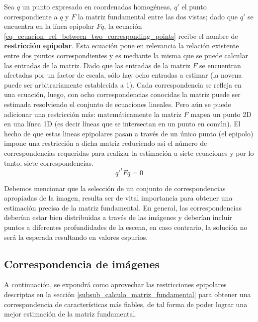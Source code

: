 \documentclass[a4paper,11pt,spanish]{article}
\begin{document}
Sea $q$ un punto expresado en coordenadas homogéneas, $q'$ el punto correspondiente a $q$ y $F$ la matriz fundamental entre las dos vistas; dado que $q'$ se encuentra en la línea epipolar $Fq$, la ecuación \eqref{eq_ecuacion_rel_between_two_corresponding_points} recibe el nombre de \textbf{restricción epipolar}. Esta ecuación pone en relevancia la relación existente entre dos puntos correspondientes y es mediante la misma que se puede calcular las entradas de la matriz. Dado que las entradas de la matriz $F$ se encuentran afectadas por un factor de escala, sólo hay ocho entradas a estimar (la novena puede ser arbitrariamente establecida a 1). Cada correspondencia se refleja en una ecuación, luego, con ocho correspondencias conocidas la matriz puede ser estimada resolviendo el conjunto de ecuaciones lineales. Pero aún se puede adicionar una restricción más: matemáticamente la matriz $F$ mapea un punto 2D en una línea 1D (es decir líneas que se intersectan en un punto en común). El hecho de que estas lineas epipolares pasan a través de un único punto (el epipolo) impone una restricción a dicha matriz reduciendo así el número de correspondencias requeridas para realizar la estimación a siete ecuaciones y por lo tanto, siete correspondencias.
\begin{equation}
  q'^tFq=0
  \label{eq_ecuacion_rel_between_two_corresponding_points}
\end{equation}

Debemos mencionar que la selección de un conjunto de correspondencias apropiadas de la imagen, resulta ser de vital importancia para obtener una estimación precisa de la matriz fundamental. En general, las correspondencias deberían estar bien distribuidas a través de las imágenes y deberían incluir puntos a diferentes profundidades de la escena, en caso contrario, la solución no será la esperada resultando en valores espurios.

\subsection{Correspondencia de imágenes}
A continuación, se expondrá como aprovechar las restricciones epipolares descriptas en la sección \ref{subsub_calculo_matriz_fundamental} para obtener una correspondencia de características más fiables, de tal forma de poder lograr una mejor estimación de la matriz fundamental.
\end{document}
